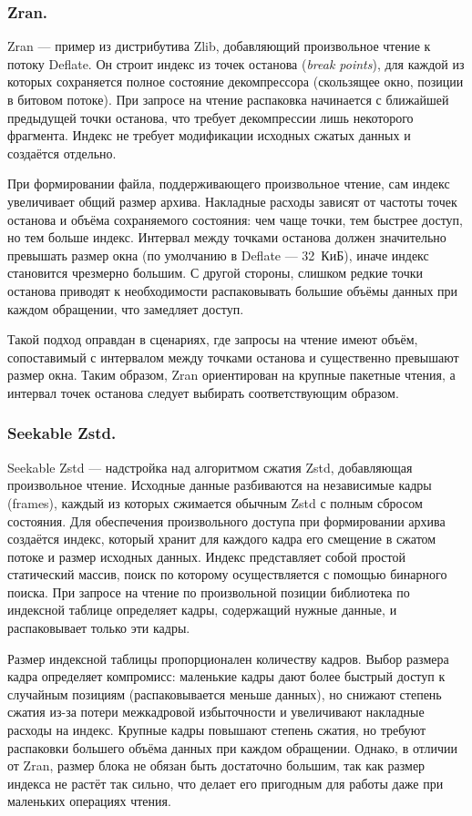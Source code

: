 \subsubsection*{Zran.}
Zran\cite{zran_example} --- пример из дистрибутива Zlib, добавляющий произвольное чтение к потоку Deflate. Он строит индекс из точек останова (\textit{break points}), для каждой из которых сохраняется полное состояние декомпрессора (скользящее окно, позиции в битовом потоке). При запросе на чтение распаковка начинается с ближайшей предыдущей точки останова, что требует декомпрессии лишь некоторого фрагмента. Индекс не требует модификации исходных сжатых данных и создаётся отдельно.

При формировании файла, поддерживающего произвольное чтение, сам индекс увеличивает общий размер архива. Накладные расходы зависят от частоты точек останова и объёма сохраняемого состояния: чем чаще точки, тем быстрее доступ, но тем больше индекс. Интервал между точками останова должен значительно превышать размер окна (по умолчанию в Deflate --- 32~КиБ), иначе индекс становится чрезмерно большим. С другой стороны, слишком редкие точки останова приводят к необходимости распаковывать большие объёмы данных при каждом обращении, что замедляет доступ.

Такой подход оправдан в сценариях, где запросы на чтение имеют объём, сопоставимый с интервалом между точками останова и существенно превышают размер окна. Таким образом, Zran ориентирован на крупные пакетные чтения, а интервал точек останова следует выбирать соответствующим образом.

\subsubsection*{Seekable Zstd.}
Seekable Zstd\cite{zstd_seekable} --- надстройка над алгоритмом сжатия Zstd, добавляющая произвольное чтение. Исходные данные разбиваются на независимые кадры (frames), каждый из которых сжимается обычным Zstd с полным сбросом состояния. Для обеспечения произвольного доступа при формировании архива создаётся индекс, который хранит для каждого кадра его смещение в сжатом потоке и размер исходных данных. Индекс представляет собой простой статический массив, поиск по которому осуществляется с помощью бинарного поиска. При запросе на чтение по произвольной позиции библиотека по индексной таблице определяет кадры, содержащий нужные данные, и распаковывает только эти кадры.

Размер индексной таблицы пропорционален количеству кадров. Выбор размера кадра определяет компромисс: маленькие кадры дают более быстрый доступ к случайным позициям (распаковывается меньше данных), но снижают степень сжатия из-за потери межкадровой избыточности и увеличивают накладные расходы на индекс. Крупные кадры повышают степень сжатия, но требуют распаковки большего объёма данных при каждом обращении. Однако, в отличии от Zran, размер блока не обязан быть достаточно большим, так как размер индекса не растёт так сильно, что делает его пригодным для работы даже при маленьких операциях чтения.

